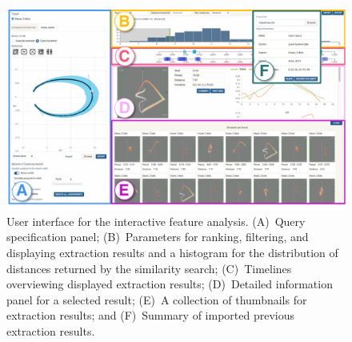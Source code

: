 \begin{figure}[t]
    \begin{minipage}{\columnwidth}
        \begin{center}
            \includegraphics[width=.99\linewidth]{vgtc_journal_latex/figures/GUI.pdf}
        \end{center}
        \begin{minipage}{\columnwidth}
        \caption{
        User interface for the interactive feature analysis. (A)~Query specification panel; (B)~Parameters for ranking, filtering, and displaying extraction results and a histogram for the distribution of distances returned by the similarity search; (C)~Timelines overviewing displayed extraction results; (D)~Detailed information panel for a selected result; (E)~A collection of thumbnails for extraction results; and (F)~Summary of imported previous extraction results.}
        \label{fig:UIFeatureExtraction}
        \end{minipage}

\end{minipage}
\end{figure}
